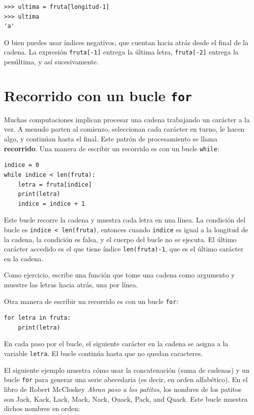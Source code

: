 \documentclass[10pt]{book}
\begin{document}
\begin{verbatim}
>>> ultima = fruta[longitud-1]
>>> ultima
'a'
\end{verbatim}
%
O bien puedes usar índices negativos, que cuentan hacia atrás desde
el final de la cadena.  La expresión {\tt fruta[-1]} entrega la última
letra, {\tt fruta[-2]} entrega la penúltima, y así sucesivamente.


\section{Recorrido con un bucle {\tt for}}
\label{for}

Muchas computaciones implican procesar una cadena trabajando un carácter a la
vez.  A menudo parten al comienzo, seleccionan cada carácter en
turno, le hacen algo, y continúan hasta el final.  Este patrón de
procesamiento se llama {\bf recorrido}.  Una manera de escribir un recorrido
es con un bucle {\tt while}:

\begin{verbatim}
indice = 0
while indice < len(fruta):
    letra = fruta[indice]
    print(letra)
    indice = indice + 1
\end{verbatim}
%
Este bucle recorre la cadena y muestra cada letra en una
línea.  La condición del bucle es {\tt indice < len(fruta)}, entonces
cuando {\tt indice} es igual a la longitud de la cadena, la
condición es falsa, y el cuerpo del bucle no se ejecuta.  El
último carácter accedido es el que tiene índice {\tt len(fruta)-1},
que es el último carácter en la cadena.

Como ejercicio, escribe una función que tome una cadena como argumento
y muestre las letras hacia atrás, una por línea.

Otra manera de escribir un recorrido es con un bucle {\tt for}:

\begin{verbatim}
for letra in fruta:
    print(letra)
\end{verbatim}
%
En cada paso por el bucle, el siguiente carácter en la cadena se asigna
a la variable {\tt letra}.  El bucle continúa hasta que no quedan
caracteres.

El siguiente ejemplo muestra cómo usar la concatenación (suma de cadenas)
y un bucle {\tt for} para generar una serie abecedaria (es decir, en
orden alfabético).  En el libro de Robert McCloskey {\em Abran
paso a los patitos}, los nombres de los patitos son Jack, Kack, Lack,
Mack, Nack, Ouack, Pack, and Quack.  Este bucle muestra dichos nombres en
orden:
\end{document}
